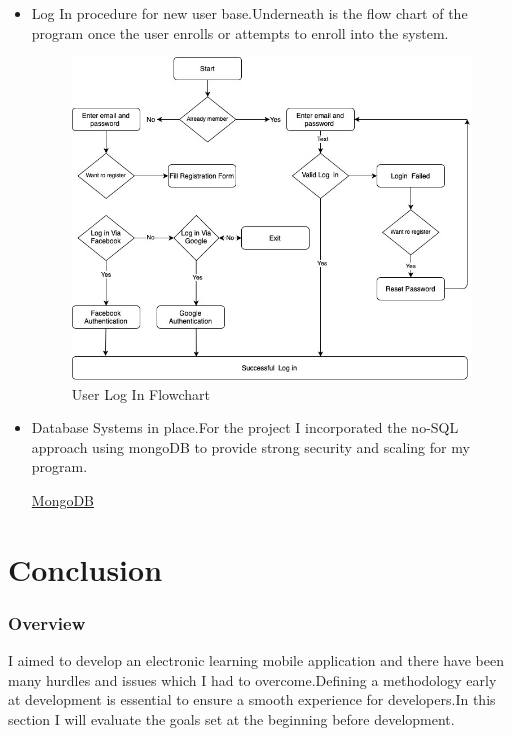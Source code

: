 \begin{itemize}

\item Log In procedure for new user base.Underneath is the flow chart of the program once the user enrolls or attempts to enroll into the system.

 \begin{figure}[H]
  \centering
\includegraphics[width=1.0\textwidth]{final-year-project-template-master/img/Flowchart.jpg}
\caption{User Log In Flowchart}
\end{figure}



\item Database Systems in place.For the project I  incorporated the no-SQL approach using mongoDB to provide strong security and scaling for my program.

\href{https://medium.com/@rsk.saikrishna/when-to-use-mongodb-rather-than-mysql-d03ceff2e922}{MongoDB} 

\end{itemize}


\chapter{Conclusion}

\subsection{Overview}

I aimed to develop an electronic learning mobile application and there have been many hurdles and issues which I had to overcome.Defining a methodology early at development is essential to ensure a smooth experience for developers.In this section I will evaluate the goals set at the beginning before development.




